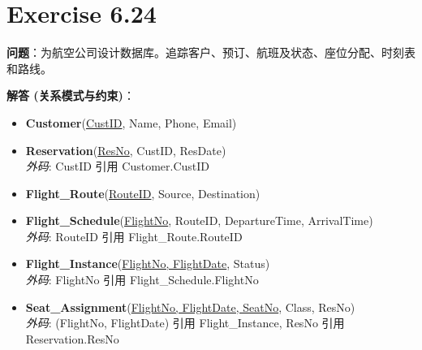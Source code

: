 \documentclass{article}
\begin{document}
\section*{Exercise 6.24}
\textbf{问题}：为航空公司设计数据库。追踪客户、预订、航班及状态、座位分配、时刻表和路线。

\vspace{0.5cm}
\textbf{解答 (关系模式与约束)}：
\begin{itemize}
    \item \textbf{Customer}(\underline{CustID}, Name, Phone, Email)
    \item \textbf{Reservation}(\underline{ResNo}, CustID, ResDate) \\
    \textit{外码}: CustID 引用 Customer.CustID
    \item \textbf{Flight\_Route}(\underline{RouteID}, Source, Destination) 
    \item \textbf{Flight\_Schedule}(\underline{FlightNo}, RouteID, DepartureTime, ArrivalTime) \\
    \textit{外码}: RouteID 引用 Flight\_Route.RouteID
    \item \textbf{Flight\_Instance}(\underline{FlightNo, FlightDate}, Status) \\
    \textit{外码}: FlightNo 引用 Flight\_Schedule.FlightNo
    \item \textbf{Seat\_Assignment}(\underline{FlightNo, FlightDate, SeatNo}, Class, ResNo) \\
    \textit{外码}: (FlightNo, FlightDate) 引用 Flight\_Instance, ResNo 引用 Reservation.ResNo
\end{itemize}
\end{document}
